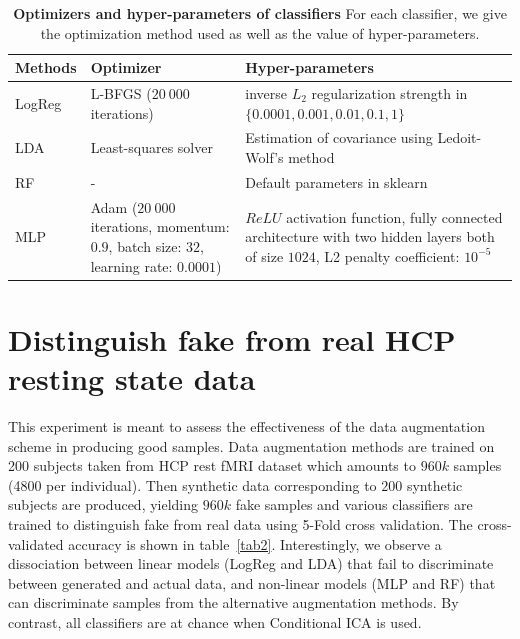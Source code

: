 \begin{table}
  \begin{tabular}{ p{} | p{} |p{}}
\hline
  Methods & Optimizer & Hyper-parameters \\
  \hline
LogReg & L-BFGS \newline ($20~000$ iterations) & inverse $L_2$ regularization
strength \newline in $\{0.0001, 0.001, 0.01, 0.1, 1 \}$ \\
  \hline
LDA  & Least-squares solver & Estimation of covariance \newline using Ledoit-Wolf's
                              method \\
  \hline
  RF &  - &  Default parameters in sklearn \\
  \hline
MLP  & Adam \newline ($20~000$ iterations, \newline momentum: $0.9$, \newline
batch size: $32$, \newline learning
       rate: $0.0001$) & $ReLU$ activation function, fully connected
                         architecture with two hidden layers both of size $1024$, L2
                         penalty coefficient: $10^{-5}$
\caption{\textbf{Optimizers and hyper-parameters of classifiers} For each classifier, we give the optimization method used as well as the value of hyper-parameters.}\label{fig:classifiers:tab} 
\end{tabular}
\end{table}


 
\section{Distinguish fake from real HCP resting state data}
This experiment is meant to assess the effectiveness of the data
augmentation scheme in producing good samples.
Data augmentation methods are trained on 200 subjects taken from HCP rest fMRI
dataset which amounts to $960k$ samples (4800
per individual). Then synthetic
data corresponding to $200$ synthetic subjects are produced, yielding
$960k$ fake samples and various classifiers are trained to distinguish fake from
real data using 5-Fold cross validation. The cross-validated accuracy is shown
in table~\ref{tab2}.
Interestingly, we observe a dissociation between linear models (LogReg
and LDA) that fail to discriminate between generated and actual data,
and non-linear models (MLP and RF) that can discriminate samples from
the alternative augmentation methods.
%
By contrast, all classifiers are at chance when Conditional ICA is used.

